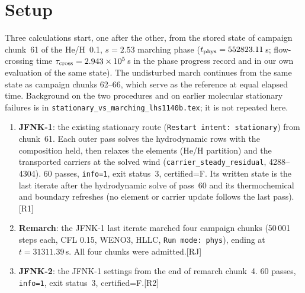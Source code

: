 \documentclass[english,a4paper]{my_memo}
\newcommand{\ev}[1]{\textnormal{\small[#1]}}
\begin{document}
\section{Setup}\label{sec:setup}

Three calculations start, one after the other, from the stored state of
campaign chunk~61 of the He/H~0.1, $s=2.53$ marching phase
($t_{\rm phys}=552823.11$\,s; flow-crossing time $\tau_{\rm cross}=2.943\times10^5$\,s
in the phase progress record and in our own evaluation of the same state).
The undisturbed march continues from the same state as campaign chunks
62--66, which serve as the reference at equal elapsed time.
Background on the two procedures and on earlier molecular stationary
failures is in \texttt{stationary\_vs\_marching\_lhs1140b.tex}; it is not
repeated here.

\begin{enumerate}
\item \textbf{JFNK-1}: the existing stationary route
(\texttt{Restart intent: stationary}) from chunk~61. Each outer pass solves
the hydrodynamic rows with the composition held, then relaxes the elements
(He/H partition) and the transported carriers at the solved wind
(\texttt{carrier\_steady\_residual},  4288--4304).
60 passes, \texttt{info=1}, exit status~3, certified=F. Its written state
is the last iterate after the hydrodynamic solve of pass~60 and its
thermochemical and boundary refreshes (no element or carrier update
follows the last pass).\ev{R1}
\item \textbf{Remarch}: the JFNK-1 last iterate marched four campaign chunks
(50\,001 steps each, CFL 0.15, WENO3, HLLC, \texttt{Run mode: phys}),
ending at $t=31311.39$\,s. All four chunks were admitted.\ev{RJ}
\item \textbf{JFNK-2}: the JFNK-1 settings from the end of remarch chunk~4.
60 passes, \texttt{info=1}, exit status~3, certified=F.\ev{R2}
\end{enumerate}
\end{document}
